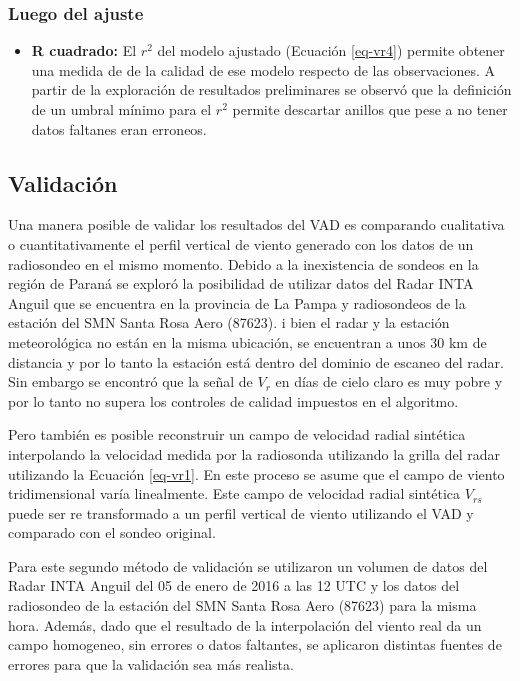 \documentclass[12pt,spanish,oneside]{book}
\providecommand{\tightlist}{%
  \setlength{\itemsep}{0pt}\setlength{\parskip}{0pt}}
\begin{document}
\subsubsection{Luego del ajuste}\label{luego-del-ajuste}

\begin{itemize}
\tightlist
\item
  \textbf{R cuadrado:} El \(r^2\) del modelo ajustado (Ecuación
  \ref{eq-vr4}) permite obtener una medida de de la calidad de ese
  modelo respecto de las observaciones. A partir de la exploración de
  resultados preliminares se observó que la definición de un umbral
  mínimo para el \(r^2\) permite descartar anillos que pese a no tener
  datos faltanes eran erroneos.
\end{itemize}

\subsection{Validación}\label{validacion}

Una manera posible de validar los resultados del VAD es comparando
cualitativa o cuantitativamente el perfil vertical de viento generado
con los datos de un radiosondeo en el mismo momento. Debido a la
inexistencia de sondeos en la región de Paraná se exploró la posibilidad
de utilizar datos del Radar INTA Anguil que se encuentra en la provincia
de La Pampa y radiosondeos de la estación del SMN Santa Rosa Aero
(87623). i bien el radar y la estación meteorológica no están en la
misma ubicación, se encuentran a unos 30 km de distancia y por lo tanto
la estación está dentro del dominio de escaneo del radar. Sin embargo se
encontró que la señal de \(V_r\) en días de cielo claro es muy pobre y
por lo tanto no supera los controles de calidad impuestos en el
algoritmo.

Pero también es posible reconstruir un campo de velocidad radial
sintética interpolando la velocidad medida por la radiosonda utilizando
la grilla del radar utilizando la Ecuación \ref{eq-vr1}. En este proceso
se asume que el campo de viento tridimensional varía linealmente. Este
campo de velocidad radial sintética \(V_{rs}\) puede ser re transformado
a un perfil vertical de viento utilizando el VAD y comparado con el
sondeo original.

Para este segundo método de validación se utilizaron un volumen de datos
del Radar INTA Anguil del 05 de enero de 2016 a las 12 UTC y los datos
del radiosondeo de la estación del SMN Santa Rosa Aero (87623) para la
misma hora. Además, dado que el resultado de la interpolación del viento
real da un campo homogeneo, sin errores o datos faltantes, se aplicaron
distintas fuentes de errores para que la validación sea más realista.
\end{document}
